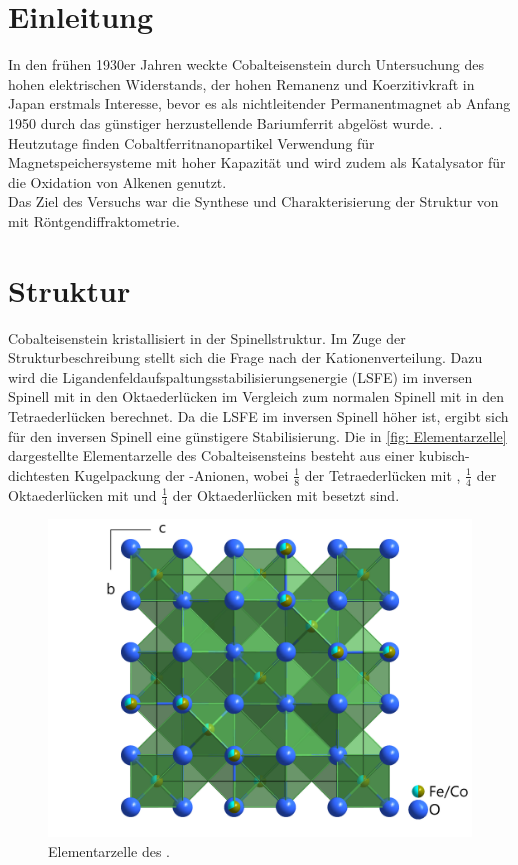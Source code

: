\documentclass[a4paper,12pt,bibliography=totocnumbered]{scrartcl}
\begin{document}
\clearpage

\renewcommand{\thepage}{\arabic{page}}
\setcounter{page}{1}


\section{Einleitung}
In den frühen 1930er Jahren weckte Cobalteisenstein durch Untersuchung des hohen elektrischen Widerstands, der hohen Remanenz und Koerzitivkraft in Japan erstmals Interesse, bevor es als nichtleitender Permanentmagnet ab Anfang 1950 durch das günstiger herzustellende Bariumferrit abgelöst wurde.
\cite{History}.
Heutzutage finden Cobaltferritnanopartikel Verwendung für Magnetspeichersysteme mit hoher Kapazität und  wird zudem als Katalysator für die Oxidation von Alkenen genutzt. \cite{Rieck} \\
Das Ziel des Versuchs war die Synthese und Charakterisierung der Struktur von  mit Röntgendiffraktometrie.

\section{Struktur}
Cobalteisenstein kristallisiert in der Spinellstruktur. \cite{Rieck} 
Im Zuge der Strukturbeschreibung stellt sich die Frage nach der Kationenverteilung. 
Dazu wird die Ligandenfeldaufspaltungsstabilisierungsenergie (LSFE) im inversen Spinell mit  in den Oktaederlücken im Vergleich zum normalen Spinell mit  in den Tetraederlücken berechnet. 
Da die LSFE im inversen Spinell höher ist, ergibt sich für den inversen Spinell eine günstigere Stabilisierung.
Die in \autoref{fig: Elementarzelle} dargestellte Elementarzelle des Cobalteisensteins besteht aus einer kubisch-dichtesten Kugelpackung der -Anionen, wobei $\frac{1}{8}$ der Tetraederlücken mit , 
$\frac{1}{4}$ der Oktaederlücken mit  und $\frac{1}{4}$ der Oktaederlücken mit  besetzt sind. \\

\begin{figure}[H]
    \centering
    \includegraphics[width=0.75 \linewidth ]{Bilder/Elementarzelle.png}
    \caption{Elementarzelle des .\cite{Rieck}}
    \label{fig: Elementarzelle}
\end{figure}
\end{document}
